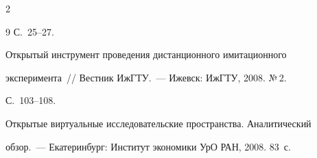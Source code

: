 \begin{multicols}{2}
{{\begin{thebibliography}{9}
С.~25--27.





Открытый инструмент проведения дистанционного имитационного 

эксперимента~// Вестник ИжГТУ.~--- Ижевск: ИжГТУ, 2008. №\,2. 

С.~103--108.



\label{end\stat}





Открытые виртуальные исследовательские пространства. Аналитический 

обзор.~--- Екатеринбург: Институт экономики УрО РАН, 2008. 83~с.

 \end{thebibliography}

}

}





\end{multicols}

